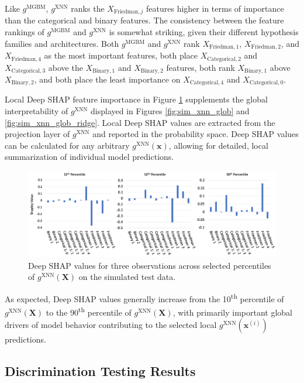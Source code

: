 \documentclass[information,article,submit,moreauthors,pdftex]{definitions/mdpi}
\begin{document}
\noindent Like $g^\text{MGBM}$, $g^\text{XNN}$ ranks the $X_{\text{Friedman},j}$ features higher in terms of importance than the categorical and binary features. The consistency between the feature rankings of $g^\text{MGBM}$ and $g^\text{XNN}$ is somewhat striking, given their different hypothesis families and architectures. Both $g^\text{MGBM}$ and $g^\text{XNN}$ rank $X_{\text{Friedman},1}$, $X_{\text{Friedman},2}$, and $X_{\text{Friedman},4}$ as the most important features, both place $X_{\text{Categorical},2}$ and $X_{\text{Categorical},3}$ above the $X_{\text{Binary},1}$ and $X_{\text{Binary},2}$ features, both rank $X_{\text{Binary},1}$ above $X_{\text{Binary},2}$, and both place the least importance on $X_{\text{Categorical},4}$ and $X_{\text{Categorical},0}$. 

Local Deep SHAP feature importance in Figure \ref{fig:sim_xnn_loc} supplements the global interpretability of $g^\text{XNN}$ displayed in Figures \ref{fig:sim_xnn_glob} and \ref{fig:sim_xnn_glob_ridge}. Local Deep SHAP values are extracted from the projection layer of $g^\text{XNN}$ and reported in the probability space. Deep SHAP values can be calculated for any arbitrary $g^\text{XNN}(\mathbf{x})$, allowing for detailed, local summarization of individual model predictions. 

\begin{figure}[H]
	\centering
	\includegraphics[width=15cm]{img/sim_xnn_loc.png}
	\caption{Deep SHAP values for three observations across selected percentiles of $g^\text{XNN}(\mathbf{X})$ on the simulated test data.}
	\label{fig:sim_xnn_loc}
\end{figure}  

\noindent As expected, Deep SHAP values generally increase from the 10\textsuperscript{th} percentile of $g^\text{XNN}(\mathbf{X})$ to the 90\textsuperscript{th} percentile of $g^\text{XNN}(\mathbf{X})$, with primarily important global drivers of model behavior contributing to the selected local $g^\text{XNN}(\mathbf{x}^{(i)})$ predictions.

\subsection{Discrimination Testing Results}\label{ssec:dis_sim}
\end{document}
